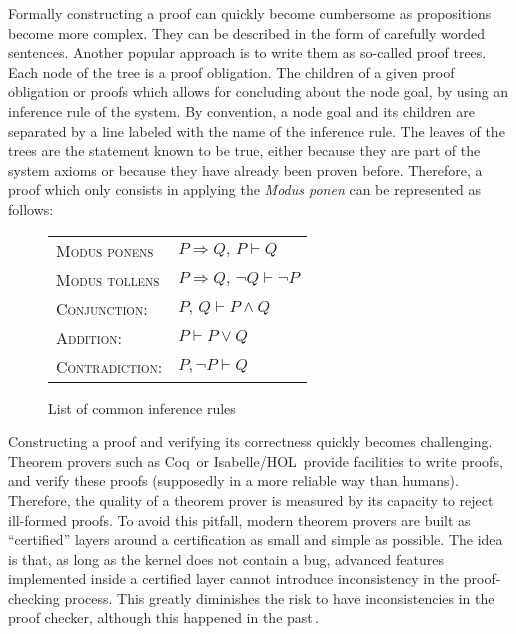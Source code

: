 Formally constructing a proof can quickly become cumbersome as propositions
become more complex.
%
They can be described in the form of carefully worded sentences.
%
Another popular approach is to write them as so-called proof trees.
%
Each node of the tree is a proof obligation.
%
The children of a given proof obligation or proofs which allows for concluding
about the node goal, by using an inference rule of the system.
%
By convention, a node goal and its children are separated by a line labeled with
the name of the inference rule.
%
The leaves of the trees are the statement known to be true, either because they
are part of the system axioms or because they have already been proven before.
%
Therefore, a proof which only consists in applying the \emph{Modus ponen} can be
represented as follows:
%
\begin{prooftree}
     
\end{prooftree}

\begin{figure}
  \begin{center}
    \begin{tabular}{ll}
      {\scshape Modus ponens} & \( P \Rightarrow Q\text{, }P \vdash Q \) \\
      {\scshape Modus tollens} &
                                 \( P \Rightarrow Q\text{, }\neg Q \vdash \neg P \) \\
      {\scshape Conjunction:} & \( P\text{, }Q \vdash P \wedge Q \) \\
      {\scshape Addition:} & \( P \vdash P \vee Q \) \\
      {\scshape Contradiction:} & \( P, \neg P \vdash Q \)
    \end{tabular}
  \end{center}

  \caption{List of common inference rules}
  \label{fig:sota:inference}
\end{figure}

Constructing a proof and verifying its correctness quickly becomes challenging.
%
Theorem provers such as Coq\,\cite{coq} or
Isabelle/HOL\,\cite{nipkow2002isabelle} provide facilities to write proofs, and
verify these proofs (supposedly in a more reliable way than humans).
%
Therefore, the quality of a theorem prover is measured by its capacity to reject
ill-formed proofs.
%
To avoid this pitfall, modern theorem provers are built as ``certified'' layers
around a certification as small and simple as possible.
%
The idea is that, as long as the kernel does not contain a bug, advanced
features implemented inside a certified layer cannot introduce inconsistency in
the proof-checking process.
%
This greatly diminishes the risk to have inconsistencies in the proof checker,
although this happened in the
past\,\cite{claret2015falso,griffioen1998comparison}.

